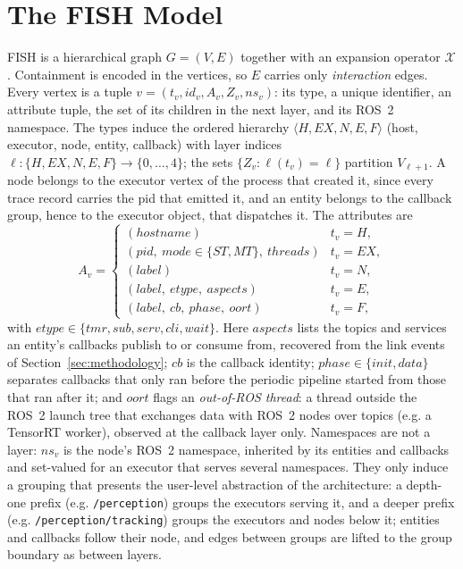 \section{The FISH Model}\label{sec:model}

FISH is a hierarchical graph $G=(V,E)$ together with an expansion
operator $\mathcal{X}$. Containment is encoded in the vertices, so $E$
carries only \emph{interaction} edges. Every vertex is a tuple
$v=(t_v,\mathit{id}_v,A_v,Z_v,\mathit{ns}_v)$: its type, a unique
identifier, an attribute tuple, the set of its children in the next
layer, and its ROS~2 namespace. The types induce the ordered hierarchy
$\langle H,EX,N,E,F\rangle$ (host, executor, node, entity, callback) with
layer indices $\ell:\{H,EX,N,E,F\}\to\{0,\dots,4\}$; the sets
$\{Z_v:\ell(t_v)=\ell\}$ partition $V_{\ell+1}$. A node belongs to the
executor vertex of the process that created it, since every trace record
carries the pid that emitted it, and an entity belongs to the callback
group, hence to the executor object, that dispatches it. The attributes are
\[
A_v=\begin{cases}
(\mathit{hostname}) & t_v=H,\\
(\mathit{pid},\ \mathit{mode}\in\{ST,MT\},\ \mathit{threads}) & t_v=EX,\\
(\mathit{label}) & t_v=N,\\
(\mathit{label},\ \mathit{etype},\ \mathit{aspects}) & t_v=E,\\
(\mathit{label},\ \mathit{cb},\ \mathit{phase},\ \mathit{oort}) & t_v=F,
\end{cases}
\]
with $\mathit{etype}\in\{\mathit{tmr},\mathit{sub},\mathit{serv},\mathit{cli},\mathit{wait}\}$.
Here $\mathit{aspects}$ lists the topics and services an entity's
callbacks publish to or consume from, recovered from the link events of
Section~\ref{sec:methodology}; $\mathit{cb}$ is the callback identity;
$\mathit{phase}\in\{\mathit{init},\mathit{data}\}$ separates callbacks
that only ran before the periodic pipeline started from those that ran
after it; and $\mathit{oort}$ flags an \emph{out-of-ROS thread}: a thread
outside the ROS~2 launch tree that exchanges data with ROS~2 nodes over
topics (e.g. a TensorRT worker), observed at the callback layer only.
Namespaces are not a layer: $\mathit{ns}_v$ is the node's ROS~2
namespace, inherited by its entities and callbacks and set-valued for an
executor that serves several namespaces. They only induce a grouping
that presents the user-level abstraction of the architecture: a
depth-one prefix (e.g. \texttt{/perception}) groups the executors
serving it, and a deeper prefix (e.g. \texttt{/perception/tracking})
groups the executors and nodes below it; entities and callbacks follow
their node, and edges between groups are lifted to the group boundary
as between layers.

